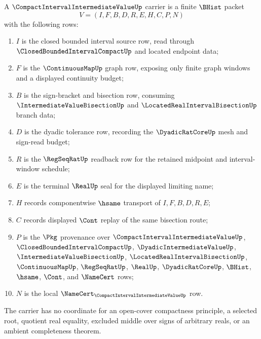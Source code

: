 \begin{definition}
\label{def:compact-interval-intermediate-value-carrier}
A $\CompactIntervalIntermediateValueUp$ carrier is a finite $\BHist$ packet
$$
V=(I,F,B,D,R,E,H,C,P,N)
$$
with the following rows:
\begin{enumerate}
\item $I$ is the closed bounded interval source row, read through $\ClosedBoundedIntervalCompactUp$ and located endpoint data;
\item $F$ is the $\ContinuousMapUp$ graph row, exposing only finite graph windows and a displayed continuity budget;
\item $B$ is the sign-bracket and bisection row, consuming $\IntermediateValueBisectionUp$ and $\LocatedRealIntervalBisectionUp$ branch data;
\item $D$ is the dyadic tolerance row, recording the $\DyadicRatCoreUp$ mesh and sign-read budget;
\item $R$ is the $\RegSeqRatUp$ readback row for the retained midpoint and interval-window schedule;
\item $E$ is the terminal $\RealUp$ seal for the displayed limiting name;
\item $H$ records componentwise $\hsame$ transport of $I,F,B,D,R,E$;
\item $C$ records displayed $\Cont$ replay of the same bisection route;
\item $P$ is the $\Pkg$ provenance over $\CompactIntervalIntermediateValueUp$, $\ClosedBoundedIntervalCompactUp$, $\DyadicIntermediateValueUp$, $\IntermediateValueBisectionUp$, $\LocatedRealIntervalBisectionUp$, $\ContinuousMapUp$, $\RegSeqRatUp$, $\RealUp$, $\DyadicRatCoreUp$, $\BHist$, $\hsame$, $\Cont$, and $\NameCert$ rows;
\item $N$ is the local $\NameCert_{\CompactIntervalIntermediateValueUp}$ row.
\end{enumerate}
The carrier has no coordinate for an open-cover compactness principle, a selected root, quotient real equality, excluded middle over signs of arbitrary reals, or an ambient completeness theorem.
\end{definition}

